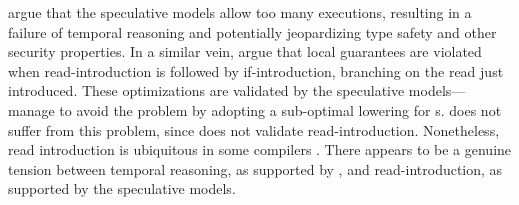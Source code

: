 \citet{DBLP:journals/pacmpl/JagadeesanJR20} argue that the speculative models
allow too many executions, resulting in a failure of temporal reasoning and
potentially jeopardizing type safety and other security properties.  In a
similar vein, \citet{promising-ldrf} argue that local \drf{} guarantees are
violated when read-introduction is followed by if-introduction, branching on
the read just introduced.  These optimizations are validated by the
speculative models---\citeauthor{promising-ldrf} manage to avoid the problem
by adopting a sub-optimal lowering for \RMW{}s.  \PwT{} does not suffer from
this problem, since \PwT{} does not validate read-introduction.  Nonetheless,
read introduction is ubiquitous in some compilers
\cite{DBLP:conf/pldi/LeeKSHDMRL17}.  There appears to be a genuine tension
between temporal reasoning, as supported by \PwT{}, and read-introduction, as
supported by the speculative models.

